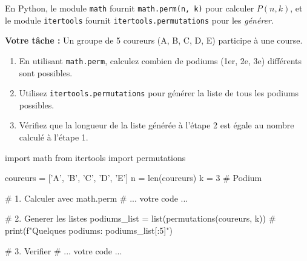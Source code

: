 \begin{exercicebox}
En Python, le module \texttt{math} fournit \texttt{math.perm(n, k)} pour calculer $P(n, k)$, et le module \texttt{itertools} fournit \texttt{itertools.permutations} pour les \textit{générer}.

\textbf{Votre tâche :}
Un groupe de 5 coureurs (A, B, C, D, E) participe à une course.
\begin{enumerate}
    \item En utilisant \texttt{math.perm}, calculez combien de podiums (1er, 2e, 3e) différents sont possibles.
    \item Utilisez \texttt{itertools.permutations} pour générer la liste de tous les podiums possibles.
    \item Vérifiez que la longueur de la liste générée à l'étape 2 est égale au nombre calculé à l'étape 1.
\end{enumerate}

\begin{codecell}
import math
from itertools import permutations

coureurs = ['A', 'B', 'C', 'D', 'E']
n = len(coureurs)
k = 3 # Podium

# 1. Calculer avec math.perm
# ... votre code ...

# 2. Generer les listes
podiums_list = list(permutations(coureurs, k))
# print(f"Quelques podiums: {podiums_list[:5]}")

# 3. Verifier
# ... votre code ...
\end{codecell}
\end{exercicebox}